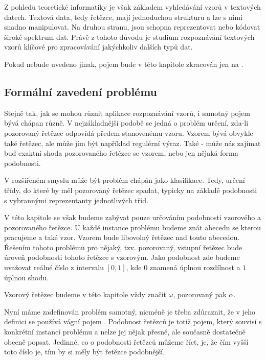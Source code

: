 \documentclass[a4paper,10pt]{article}
\begin{document}
Z pohledu teoretické informatiky je však základem vyhledávání vzorů v textových datech. Textová data, tedy řetězce, mají jednoduchou strukturu a lze s nimi snadno manipulovat. Na druhou stranu, jsou schopna reprezentovat nebo kódovat široké spektrum dat. Právě z tohoto důvodu je studium rozpoznávání textových vzorů klíčové pro zpracovávání jakýchkoliv dalších typů dat.

\begin{note}
 Pokud nebude uvedeno jinak, pojem  bude v této kapitole zkracován jen na .
\end{note}

\subsection{Formální zavedení problému}
Stejně tak, jak se mohou různit aplikace rozpoznávání vzorů, i samotný pojem  bývá chápan různě. V nejzákladnější podobě se jedná o problém určení, zda-li pozorovaný řetězec odpovídá předem stanovenému vzoru. Vzorem bývá obvykle také řetězec, ale může jím být například regulérní výraz. Také - může nás zajímat buď exaktní shoda pozorovaného řetězce se vzorem, nebo jen nějaká forma podobnosti. 

V rozšířeném smyslu může být problém chápán jako klasifikace. Tedy, určení třídy, do které by měl pozorovaný řetězec spadat, typicky na základě podobnosti s vybrannými reprezentanty jednotlivých tříd. 

V této kapitole se však budeme zabývat pouze určováním podobnosti vzorového a pozorovaného řetězce. U každé instance problému budeme znát abecedu se kterou pracujeme a také vzor. Vzorem bude libovolný řetězec nad touto abecedou. Řešením tohoto problému pro nějaký, tzv. pozorovaný, vstupní řetězec bude úroveň podobnosti tohoto řetězce s vzorovým. Jako podobnost zde budeme uvažovat reálné číslo z intervalu $[0, 1]$, kde $0$ znamená úplnou rozdílnost a $1$ úplnou shodu. 

\begin{note}
 Vzorový řetězec budeme v této kapitole vždy značit $\omega$, pozorovaný pak $\alpha$.
\end{note}

Nyní máme zadefinován problém samotný, nicméně je třeba zdůraznit, že v jeho definici se používá vágní pojem . Podobnost řetězců je totiž pojem, který souvisí s konkrétní instancí problému a nelze jej nějak přesně, ale současně dostatečně obecně popsat. Jedinné, co o podobnosti řetězců můžeme říct, je, že čím vyšší toto číslo je, tím by si měly být řetězce podobnější.
\end{document}
